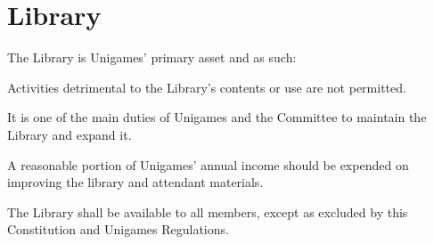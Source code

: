 \documentclass[a4paper]{article}
\begin{document}
\section{Library} \label{sec:library}
\begin{myEnumerate}
    \item The Library is Unigames' primary asset and as such:
        \begin{myEnumerate}
            \item Activities detrimental to the Library's contents or use are not permitted.
            \item It is one of the main duties of Unigames and the Committee to maintain the Library and expand it.
            \item A reasonable portion of Unigames' annual income should be expended on improving the library and attendant materials.
            \item The Library shall be available to all members, except as excluded by this Constitution and Unigames Regulations.
        \end{myEnumerate}
\end{myEnumerate}
\end{document}
